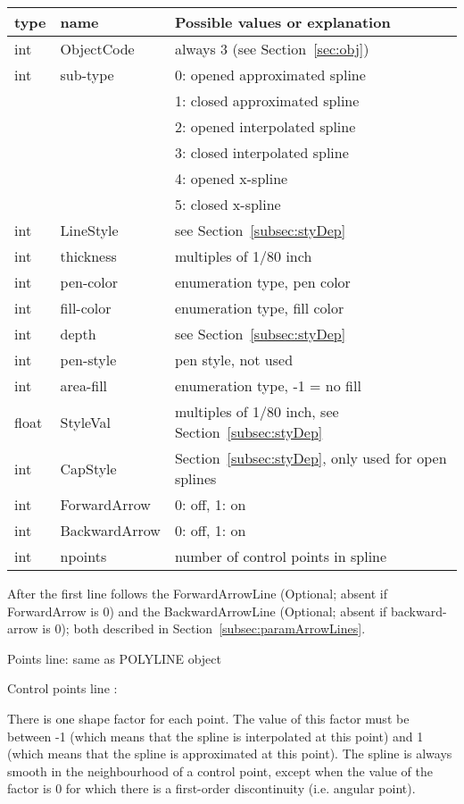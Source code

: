 \documentclass[10pt, a4paper]{article}
\begin{document}
\begin{tabular}{|lll|}
\hline
type & name & Possible values or explanation \\
\hline
\hline
int   & ObjectCode    & always 3 (see Section~\ref{sec:obj}) \\
int   & sub-type       & 0: opened approximated spline \\
&&                       1: closed approximated spline \\
&&                       2: opened interpolated spline \\
&&                       3: closed interpolated spline \\
&&                       4: opened x-spline \\
&&                       5: closed x-spline \\
int   & LineStyle     & see Section~\ref{subsec:styDep} \\
int   & thickness      & multiples of 1/80 inch \\
int   & pen-color      & enumeration type, pen color \\
int   & fill-color     & enumeration type, fill color \\
int   & depth          & see Section~\ref{subsec:styDep} \\
int   & pen-style      & pen style, not used \\
int   & area-fill      & enumeration type, -1 = no fill \\%
float & StyleVal      & multiples of 1/80 inch, see Section~\ref{subsec:styDep} \\
int   & CapStyle      & Section~\ref{subsec:styDep}, only used for open splines \\
int   & ForwardArrow  & 0: off, 1: on \\
int   & BackwardArrow & 0: off, 1: on \\
int   & npoints        & number of control points in spline \\
\hline
\end{tabular}

After the first line follows the ForwardArrowLine 
(Optional; absent if ForwardArrow is 0) and 
the BackwardArrowLine (Optional; absent if backward-arrow is 0); 
both described in Section~\ref{subsec:paramArrowLines}. 

    Points line: same as POLYLINE object

    Control points line :

    There is one shape factor for each point. The value of this factor
    must be between -1 (which means that the spline is interpolated at
    this point) and 1 (which means that the spline is approximated at
    this point). The spline is always smooth in the neighbourhood of a
    control point, except when the value of     the factor is 0 for which
    there is a first-order discontinuity (i.e. angular point).
\end{document}
